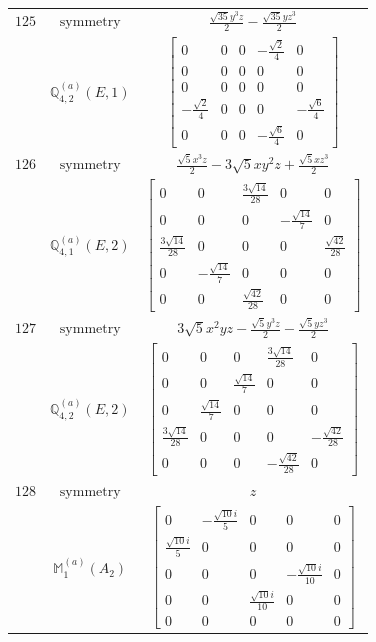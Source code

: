 \documentclass[fleqn,8pt,landscape]{jsarticle}
\begin{document}
\begin{longtable}{ccc}
$ 125 $ & $ \text{symmetry} $ & $ \frac{\sqrt{35} y^{3} z}{2} - \frac{\sqrt{35} y z^{3}}{2} $ \\
$  $ & $ \mathbb{Q}_{4,2}^{(a)}(E,1) $ & $ \begin{bmatrix} 0 & 0 & 0 & - \frac{\sqrt{2}}{4} & 0 \\ 0 & 0 & 0 & 0 & 0 \\ 0 & 0 & 0 & 0 & 0 \\ - \frac{\sqrt{2}}{4} & 0 & 0 & 0 & - \frac{\sqrt{6}}{4} \\ 0 & 0 & 0 & - \frac{\sqrt{6}}{4} & 0 \end{bmatrix} $ \\ \hline
$ 126 $ & $ \text{symmetry} $ & $ \frac{\sqrt{5} x^{3} z}{2} - 3 \sqrt{5} x y^{2} z + \frac{\sqrt{5} x z^{3}}{2} $ \\
$  $ & $ \mathbb{Q}_{4,1}^{(a)}(E,2) $ & $ \begin{bmatrix} 0 & 0 & \frac{3 \sqrt{14}}{28} & 0 & 0 \\ 0 & 0 & 0 & - \frac{\sqrt{14}}{7} & 0 \\ \frac{3 \sqrt{14}}{28} & 0 & 0 & 0 & \frac{\sqrt{42}}{28} \\ 0 & - \frac{\sqrt{14}}{7} & 0 & 0 & 0 \\ 0 & 0 & \frac{\sqrt{42}}{28} & 0 & 0 \end{bmatrix} $ \\ \hline
$ 127 $ & $ \text{symmetry} $ & $ 3 \sqrt{5} x^{2} y z - \frac{\sqrt{5} y^{3} z}{2} - \frac{\sqrt{5} y z^{3}}{2} $ \\
$  $ & $ \mathbb{Q}_{4,2}^{(a)}(E,2) $ & $ \begin{bmatrix} 0 & 0 & 0 & \frac{3 \sqrt{14}}{28} & 0 \\ 0 & 0 & \frac{\sqrt{14}}{7} & 0 & 0 \\ 0 & \frac{\sqrt{14}}{7} & 0 & 0 & 0 \\ \frac{3 \sqrt{14}}{28} & 0 & 0 & 0 & - \frac{\sqrt{42}}{28} \\ 0 & 0 & 0 & - \frac{\sqrt{42}}{28} & 0 \end{bmatrix} $ \\ \hline
$ 128 $ & $ \text{symmetry} $ & $ z $ \\
$  $ & $ \mathbb{M}_{1}^{(a)}(A_{2}) $ & $ \begin{bmatrix} 0 & - \frac{\sqrt{10} i}{5} & 0 & 0 & 0 \\ \frac{\sqrt{10} i}{5} & 0 & 0 & 0 & 0 \\ 0 & 0 & 0 & - \frac{\sqrt{10} i}{10} & 0 \\ 0 & 0 & \frac{\sqrt{10} i}{10} & 0 & 0 \\ 0 & 0 & 0 & 0 & 0 \end{bmatrix} $ \\ \hline

\end{longtable}
\end{document}
